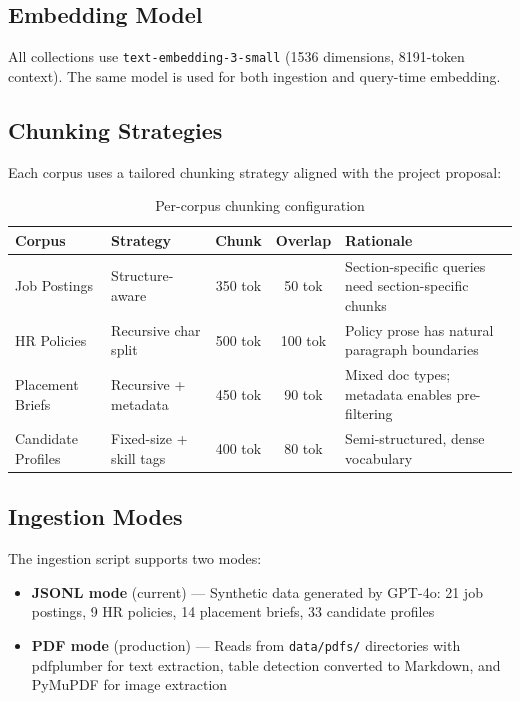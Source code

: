 \documentclass[12pt, a4paper]{article}
\begin{document}
\subsection{Embedding Model}

All collections use \texttt{text-embedding-3-small} (1536 dimensions, 8191-token context). The same model is used for both ingestion and query-time embedding.

\subsection{Chunking Strategies}

Each corpus uses a tailored chunking strategy aligned with the project proposal:

\begin{table}[H]
\centering
\caption{Per-corpus chunking configuration}
\begin{tabularx}{\textwidth}{l l c c X}
\toprule
\textbf{Corpus} & \textbf{Strategy} & \textbf{Chunk} & \textbf{Overlap} & \textbf{Rationale} \\
\midrule
Job Postings & Structure-aware & 350 tok & 50 tok & Section-specific queries need section-specific chunks \\
HR Policies & Recursive char split & 500 tok & 100 tok & Policy prose has natural paragraph boundaries \\
Placement Briefs & Recursive + metadata & 450 tok & 90 tok & Mixed doc types; metadata enables pre-filtering \\
Candidate Profiles & Fixed-size + skill tags & 400 tok & 80 tok & Semi-structured, dense vocabulary \\
\bottomrule
\end{tabularx}
\label{tab:chunking}
\end{table}

\subsection{Ingestion Modes}

The ingestion script supports two modes:

\begin{itemize}[leftmargin=1.5em]
    \item \textbf{JSONL mode} (current) — Synthetic data generated by GPT-4o: 21 job postings, 9 HR policies, 14 placement briefs, 33 candidate profiles
    \item \textbf{PDF mode} (production) — Reads from \texttt{data/pdfs/} directories with pdfplumber for text extraction, table detection converted to Markdown, and PyMuPDF for image extraction
\end{itemize}
\end{document}
